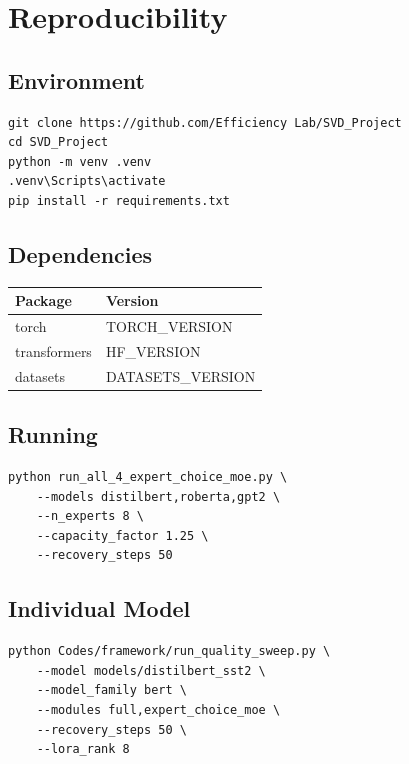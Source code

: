 \section{Reproducibility}

\subsection{Environment}

\begin{lstlisting}
git clone https://github.com/Efficiency Lab/SVD_Project
cd SVD_Project
python -m venv .venv
.venv\Scripts\activate
pip install -r requirements.txt
\end{lstlisting}

\subsection{Dependencies}

\begin{table}[H]
\centering
\small
\begin{tabular}{ll}
\toprule
\textbf{Package} & \textbf{Version} \\
\midrule
torch & {{TORCH\_VERSION}} \\
transformers & {{HF\_VERSION}} \\
datasets & {{DATASETS\_VERSION}} \\
\bottomrule
\end{tabular}
\end{table}

\subsection{Running}

\begin{lstlisting}
python run_all_4_expert_choice_moe.py \
    --models distilbert,roberta,gpt2 \
    --n_experts 8 \
    --capacity_factor 1.25 \
    --recovery_steps 50
\end{lstlisting}

\subsection{Individual Model}

\begin{lstlisting}
python Codes/framework/run_quality_sweep.py \
    --model models/distilbert_sst2 \
    --model_family bert \
    --modules full,expert_choice_moe \
    --recovery_steps 50 \
    --lora_rank 8
\end{lstlisting}

